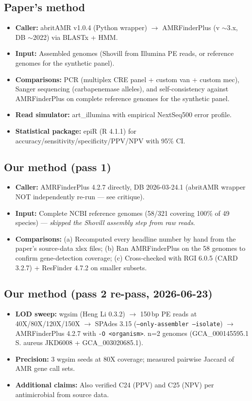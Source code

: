 \documentclass[11pt,a4paper]{article}
\begin{document}
\subsection{Paper's method}
\begin{itemize}[leftmargin=1.5em]
  \item \textbf{Caller:} abritAMR v1.0.4 (Python wrapper) $\to$ AMRFinderPlus (v $\sim$3.x, DB $\sim$2022) via BLASTx + HMM.
  \item \textbf{Input:} Assembled genomes (Shovill from Illumina PE reads, or reference genomes for the synthetic panel).
  \item \textbf{Comparisons:} PCR (multiplex CRE panel + custom van + custom mec), Sanger sequencing (carbapenemase alleles), and self-consistency against AMRFinderPlus on complete reference genomes for the synthetic panel.
  \item \textbf{Read simulator:} art\_illumina with empirical NextSeq500 error profile.
  \item \textbf{Statistical package:} epiR (R 4.1.1) for accuracy/sensitivity/specificity/PPV/NPV with 95\% CI.
\end{itemize}

\subsection{Our method (pass 1)}
\begin{itemize}[leftmargin=1.5em]
  \item \textbf{Caller:} AMRFinderPlus 4.2.7 directly, DB 2026-03-24.1 (abritAMR wrapper NOT independently re-run --- see critique).
  \item \textbf{Input:} Complete NCBI reference genomes (58/321 covering 100\% of 49 species) --- \emph{skipped the Shovill assembly step from raw reads}.
  \item \textbf{Comparisons:} (a) Recomputed every headline number by hand from the paper's source-data xlsx files; (b) Ran AMRFinderPlus on the 58 genomes to confirm gene-detection coverage; (c) Cross-checked with RGI 6.0.5 (CARD 3.2.7) + ResFinder 4.7.2 on smaller subsets.
\end{itemize}

\subsection{Our method (pass 2 re-pass, 2026-06-23)}
\begin{itemize}[leftmargin=1.5em]
  \item \textbf{LOD sweep:} wgsim (Heng Li 0.3.2) $\to$ 150\,bp PE reads at 40X/80X/120X/150X $\to$ SPAdes 3.15 (\texttt{--only-assembler --isolate}) $\to$ AMRFinderPlus 4.2.7 with \texttt{-O <organism>}. n=2 genomes (GCA\_000145595.1 S. aureus JKD6008 + GCA\_003020685.1).
  \item \textbf{Precision:} 3 wgsim seeds at 80X coverage; measured pairwise Jaccard of AMR gene call sets.
  \item \textbf{Additional claims:} Also verified C24 (PPV) and C25 (NPV) per antimicrobial from source data.
\end{itemize}
\end{document}
